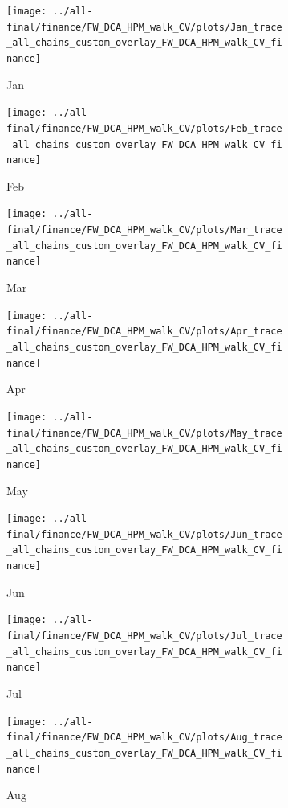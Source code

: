 \documentclass[ngerman]{ttlab-qualify}
\begin{document}
\newpage
\begin{figure}[H]
\centering
  \begin{subfigure}{.3\linewidth}
  \texttt{[image: ../all-final/finance/FW\_DCA\_HPM\_walk\_CV/plots/Jan\_trace\_all\_chains\_custom\_overlay\_FW\_DCA\_HPM\_walk\_CV\_finance]}\hfill
  \caption{Jan}
  \end{subfigure}
  \begin{subfigure}{.3\linewidth}
  \texttt{[image: ../all-final/finance/FW\_DCA\_HPM\_walk\_CV/plots/Feb\_trace\_all\_chains\_custom\_overlay\_FW\_DCA\_HPM\_walk\_CV\_finance]}\hfill
  \caption{Feb}
  \end{subfigure}
  \begin{subfigure}{.3\linewidth}
  \texttt{[image: ../all-final/finance/FW\_DCA\_HPM\_walk\_CV/plots/Mar\_trace\_all\_chains\_custom\_overlay\_FW\_DCA\_HPM\_walk\_CV\_finance]}\hfill
  \caption{Mar}
  \end{subfigure}\par\medskip
  \begin{subfigure}{.3\linewidth}
  \texttt{[image: ../all-final/finance/FW\_DCA\_HPM\_walk\_CV/plots/Apr\_trace\_all\_chains\_custom\_overlay\_FW\_DCA\_HPM\_walk\_CV\_finance]}\hfill
  \caption{Apr}
  \end{subfigure}
  \begin{subfigure}{.3\linewidth}
  \texttt{[image: ../all-final/finance/FW\_DCA\_HPM\_walk\_CV/plots/May\_trace\_all\_chains\_custom\_overlay\_FW\_DCA\_HPM\_walk\_CV\_finance]}\hfill
  \caption{May}
  \end{subfigure}
  \begin{subfigure}{.3\linewidth}
  \texttt{[image: ../all-final/finance/FW\_DCA\_HPM\_walk\_CV/plots/Jun\_trace\_all\_chains\_custom\_overlay\_FW\_DCA\_HPM\_walk\_CV\_finance]}\hfill
  \caption{Jun}
  \end{subfigure}\par\medskip
  \begin{subfigure}{.3\linewidth}
  \texttt{[image: ../all-final/finance/FW\_DCA\_HPM\_walk\_CV/plots/Jul\_trace\_all\_chains\_custom\_overlay\_FW\_DCA\_HPM\_walk\_CV\_finance]}\hfill
  \caption{Jul}
  \end{subfigure}
  \begin{subfigure}{.3\linewidth}
  \texttt{[image: ../all-final/finance/FW\_DCA\_HPM\_walk\_CV/plots/Aug\_trace\_all\_chains\_custom\_overlay\_FW\_DCA\_HPM\_walk\_CV\_finance]}\hfill
  \caption{Aug}
  \end{subfigure}
  \begin{subfigure}{.3\linewidth}

\end{subfigure}
\end{figure}
\end{document}

